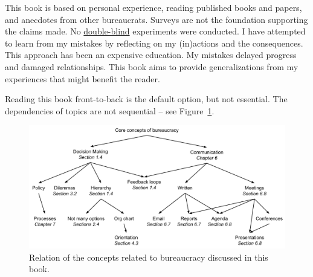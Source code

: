 This book is based on personal experience, reading published books and papers, and anecdotes from other bureaucrats. Surveys are not the foundation supporting the claims made. 
No \href{https://en.wikipedia.org/wiki/Blinded_experiment}{double-blind} 
experiments were conducted. 
I have attempted to learn from my mistakes by reflecting on my (in)actions and the consequences. This approach has been an expensive education. My mistakes delayed progress and damaged relationships. This book aims to provide generalizations from my experiences that might benefit the reader.


Reading this book front-to-back is the default option, but not essential. The dependencies of topics are not sequential -- see Figure~\ref{fig:core-concepts}.

\begin{figure}[ht]
    \centering
    \includegraphics[width=1\textwidth]{images/core_concepts_map.pdf}
    \caption{Relation of the concepts related to bureaucracy discussed in this book. }
    \label{fig:core-concepts}
\end{figure}


